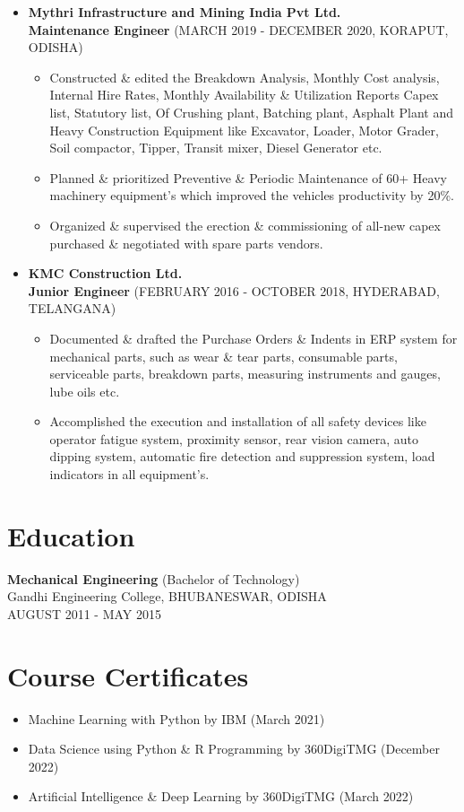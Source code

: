 \documentclass[a4paper,11pt]{article}
\begin{document}
\begin{itemize}[leftmargin=*,label=--]
  \item \textbf{Mythri Infrastructure and Mining India Pvt Ltd.} \\
  \textbf{Maintenance Engineer} (MARCH 2019 - DECEMBER 2020, KORAPUT, ODISHA)
  \begin{itemize}[label={$\bullet$}]
    \item Constructed \& edited the Breakdown Analysis, Monthly Cost analysis, Internal Hire Rates, Monthly Availability \& Utilization Reports Capex list, Statutory list, Of Crushing plant, Batching plant, Asphalt Plant and Heavy Construction Equipment like Excavator, Loader, Motor Grader, Soil compactor, Tipper, Transit mixer, Diesel Generator etc.
    \item Planned \& prioritized Preventive \& Periodic Maintenance of 60+ Heavy machinery equipment’s which improved the vehicles productivity by 20\%.
    \item Organized \& supervised the erection \& commissioning of all-new capex purchased \& negotiated with spare parts vendors.
  \end{itemize}

  \item \textbf{KMC Construction Ltd.} \\
  \textbf{Junior Engineer} (FEBRUARY 2016 - OCTOBER 2018, HYDERABAD, TELANGANA)
  \begin{itemize}[label={$\bullet$}]
    \item Documented \& drafted the Purchase Orders \& Indents in ERP system for mechanical parts, such as wear \& tear parts, consumable parts, serviceable parts, breakdown parts, measuring instruments and gauges, lube oils etc.
    \item Accomplished the execution and installation of all safety devices like operator fatigue system, proximity sensor, rear vision camera, auto dipping system, automatic fire detection and suppression system, load indicators in all equipment’s.
  \end{itemize}
\end{itemize}

\section*{Education}
\textbf{Mechanical Engineering} (Bachelor of Technology) \\
Gandhi Engineering College, BHUBANESWAR, ODISHA \\
AUGUST 2011 - MAY 2015

\section*{Course Certificates}
\begin{itemize}
  \item Machine Learning with Python by IBM (March 2021)
  \item Data Science using Python \& R Programming by 360DigiTMG (December 2022)
  \item Artificial Intelligence \& Deep Learning by 360DigiTMG (March 2022)
\end{itemize}
\end{document}

